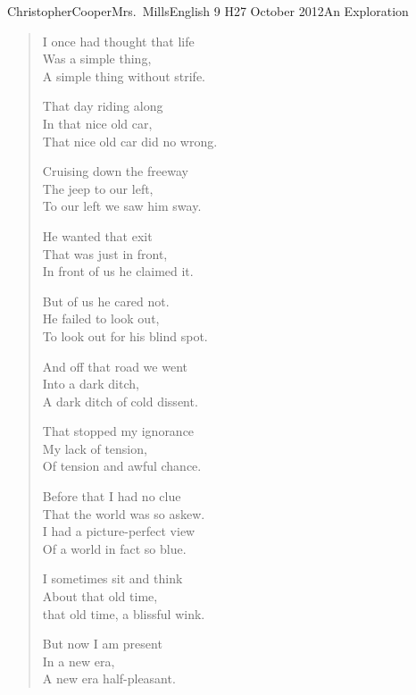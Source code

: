\documentclass[12pt,letterpaper]{article}
\begin{document}
\begin{mla}{Christopher}{Cooper}{Mrs.~Mills}{English 9 H}{27 October 2012}{An Exploration}


\singlespacing
\begin{verse}
\parindent=-45pt
\noindent
\hspace{-45pt}I once had thought that life \\
Was a simple thing, \\
A simple thing without strife. 

That day riding along \\
In that nice old car, \\
That nice old car did no wrong. 

Cruising down the freeway \\
The jeep to our left, \\
To our left we saw him sway.

He wanted that exit \\
That was just in front, \\
In front of us he claimed it.

But of us he cared not. \\
He failed to look out, \\
To look out for his blind spot.

And off that road we went \\
Into a dark ditch, \\
A dark ditch of cold dissent.

That stopped my ignorance \\
My lack of tension, \\
Of tension and awful chance.

\hspace{15pt}Before that I had no clue \\
\hspace{15pt}That the world was so askew. \\
\hspace{7pt}I had a picture-perfect view \\
\hspace{15pt}Of a world in fact so blue.

I sometimes sit and think \\
About that old time, \\
that old time, a blissful wink.

But now I am present \\
In a new era, \\
A new era half-pleasant.


\end{verse}
\end{mla}
\end{document}
